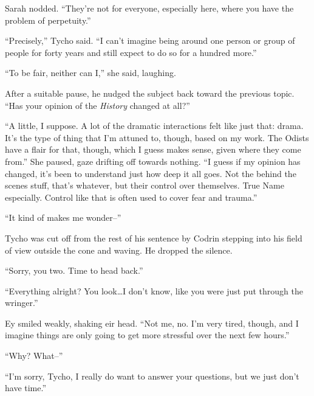 Sarah nodded. ``They're not for everyone, especially here, where you have the problem of perpetuity.''

``Precisely,'' Tycho said. ``I can't imagine being around one person or group of people for forty years and still expect to do so for a hundred more.''

``To be fair, neither can I,'' she said, laughing.

After a suitable pause, he nudged the subject back toward the previous topic. ``Has your opinion of the \emph{History} changed at all?''

``A little, I suppose. A lot of the dramatic interactions felt like just that: drama. It's the type of thing that I'm attuned to, though, based on my work. The Odists have a flair for that, though, which I guess makes sense, given where they come from.'' She paused, gaze drifting off towards nothing. ``I guess if my opinion has changed, it's been to understand just how deep it all goes. Not the behind the scenes stuff, that's whatever, but their control over themselves. True Name especially. Control like that is often used to cover fear and trauma.''

``It kind of makes me wonder--''

Tycho was cut off from the rest of his sentence by Codrin stepping into his field of view outside the cone and waving. He dropped the silence.

``Sorry, you two. Time to head back.''

``Everything alright? You look\ldots I don't know, like you were just put through the wringer.''

Ey smiled weakly, shaking eir head. ``Not me, no. I'm very tired, though, and I imagine things are only going to get more stressful over the next few hours.''

``Why? What--''

``I'm sorry, Tycho, I really do want to answer your questions, but we just don't have time.''
